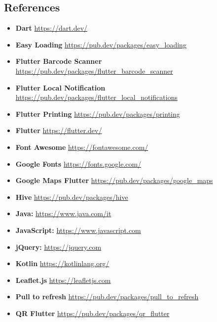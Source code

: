 \documentclass[table, 12pt]{article}
\begin{document}
\subsection{References}
\label{references}
\begin{itemize}
    \item \textbf{Dart} \href{https://dart.dev/}{https://dart.dev/}
    \item \textbf{Easy Loading} \href{https://pub.dev/packages/easy_loading}{https://pub.dev/packages/easy\_loading}
    \item \textbf{Flutter Barcode Scanner} \href{https://pub.dev/packages/flutter_barcode_scanner}{https://pub.dev/packages/flutter\_barcode\_scanner}
    \item \textbf{Flutter Local Notification} \href{https://pub.dev/packages/flutter_local_notifications}{https://pub.dev/packages/flutter\_local\_notifications}
    \item \textbf{Flutter Printing} \href{https://pub.dev/packages/printing}{https://pub.dev/packages/printing}
    \item \textbf{Flutter} \href{https://flutter.dev/}{https://flutter.dev/}
    \item \textbf{Font Awesome} \href{https://fontawesome.com/}{https://fontawesome.com/}
    \item \textbf{Google Fonts} \href{https://fonts.google.com/}{https://fonts.google.com/}
    \item \textbf{Google Maps Flutter} \href{https://pub.dev/packages/google_maps}{https://pub.dev/packages/google\_maps}
    \item \textbf{Hive} \href{https://pub.dev/packages/hive}{https://pub.dev/packages/hive}
    \item \textbf{Java: } \href{https://www.java.com/it}{https://www.java.com/it}
    \item \textbf{JavaScript: } \href{https://www.javascript.com}{https://www.javascript.com}
    \item \textbf{jQuery: } \href{https://jquery.com}{https://jquery.com}
    \item \textbf{Kotlin} \href{https://kotlinlang.org/}{https://kotlinlang.org/}
    \item \textbf{Leaflet.js} \href{https://leafletjs.com}{https://leafletjs.com}
    \item \textbf{Pull to refresh} \href{https://pub.dev/packages/pull_to_refresh}{https://pub.dev/packages/pull\_to\_refresh}
    \item \textbf{QR Flutter} \href{https://pub.dev/packages/qr_flutter}{https://pub.dev/packages/qr\_flutter}

\end{itemize}
\end{document}

